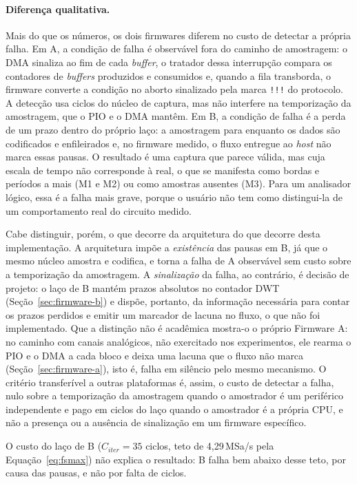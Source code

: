 \paragraph{Diferença qualitativa.} Mais do que os números, os dois
firmwares diferem no custo de detectar a própria falha. Em A, a condição de
falha é observável fora do caminho de amostragem: o \ac{DMA} sinaliza ao fim
de cada \emph{buffer}, o tratador dessa interrupção compara os contadores de
\emph{buffers} produzidos e consumidos e, quando a fila transborda, o
firmware converte a condição no aborto sinalizado pela marca \texttt{!!!} do
protocolo. A detecção usa ciclos do núcleo de captura, mas não interfere na
temporização da amostragem, que o \ac{PIO} e o \ac{DMA} mantêm. Em B, a condição de falha é a perda de um prazo dentro do próprio
laço: a amostragem para enquanto os dados são codificados e enfileirados e,
no firmware medido, o fluxo entregue ao \emph{host} não marca essas pausas. O resultado é
uma captura que parece válida, mas cuja escala de tempo não corresponde à real,
o que se manifesta como bordas e períodos a mais (M1 e M2) ou como amostras
ausentes (M3). Para um analisador lógico, essa é a falha mais grave, porque o
usuário não tem como distingui-la de um comportamento real do circuito medido.

Cabe distinguir, porém, o que decorre da arquitetura do que decorre desta
implementação. A arquitetura impõe a \emph{existência} das pausas em B, já que
o mesmo núcleo amostra e codifica, e torna a falha de A observável sem custo
sobre a temporização da amostragem. A \emph{sinalização} da falha, ao contrário, é
decisão de projeto: o laço de B mantém prazos absolutos no contador \ac{DWT}
(Seção~\ref{sec:firmware-b}) e dispõe, portanto, da informação necessária para
contar os prazos perdidos e emitir um marcador de lacuna no fluxo, o que não
foi implementado. Que a distinção não é acadêmica mostra-o o próprio
Firmware A: no caminho com canais analógicos, não exercitado nos
experimentos, ele rearma o \ac{PIO} e o \ac{DMA} a cada bloco e deixa uma
lacuna que o fluxo não marca (Seção~\ref{sec:firmware-a}), isto é, falha em
silêncio pelo mesmo mecanismo. O critério transferível a outras
plataformas é, assim, o custo de detectar a falha, nulo sobre a temporização
da amostragem quando o amostrador é um periférico independente e pago em
ciclos do laço quando o amostrador é a própria \ac{CPU}, e não a presença ou a
ausência de sinalização em um firmware específico.

O custo do laço de B ($C_{iter} = 35$ ciclos, teto de 4,29\,MSa/s pela
Equação~\ref{eq:fsmax}) não explica o resultado: B falha bem abaixo desse
teto, por causa das pausas, e não por falta de ciclos.

